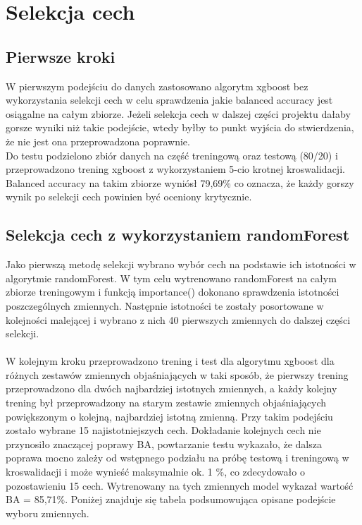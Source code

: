 \documentclass{article}
\begin{document}
\section{Selekcja cech}

\subsection{Pierwsze kroki}

W pierwszym podejściu do danych zastosowano algorytm xgboost bez wykorzystania selekcji cech w celu sprawdzenia jakie balanced accuracy jest osiągalne na całym zbiorze. Jeżeli selekcja cech w dalszej części projektu dałaby gorsze wyniki niż takie podejście, wtedy byłby to punkt wyjścia do stwierdzenia, że nie jest ona przeprowadzona poprawnie. \\
Do testu podzielono zbiór danych na część treningową oraz testową (80/20) i przeprowadzono trening xgboost z wykorzystaniem 5-cio krotnej kroswalidacji.
Balanced accuracy na takim zbiorze wyniósł 79,69\% co oznacza, że każdy gorszy wynik po selekcji cech powinien być oceniony krytycznie.

\subsection{Selekcja cech z wykorzystaniem randomForest}

Jako pierwszą metodę selekcji wybrano wybór cech na podstawie ich istotności  w algorytmie randomForest. W tym celu wytrenowano randomForest na całym zbiorze treningowym i funkcją importance() dokonano sprawdzenia istotności poszczególnych zmiennych. Następnie istotności te zostały posortowane w kolejności malejącej i wybrano z nich 40 pierwszych zmiennych do dalszej części selekcji. \\ \\
W kolejnym kroku przeprowadzono trening i test dla algorytmu xgboost dla różnych zestawów zmiennych objaśniających w taki sposób, że pierwszy trening przeprowadzono dla dwóch najbardziej istotnych zmiennych, a każdy kolejny trening był przeprowadzony na starym zestawie zmiennych objaśniających powiększonym o kolejną, najbardziej istotną zmienną. Przy takim podejściu zostało wybrane 15 najistotniejszych cech. Dokładanie kolejnych cech nie przynosiło znaczącej poprawy BA, powtarzanie testu wykazało, że dalsza poprawa mocno zależy od wstępnego podziału na próbę testową i treningową w kroswalidacji i może wynieść maksymalnie ok. 1 \%, co zdecydowało o pozostawieniu 15 cech.  Wytrenowany na tych zmiennych model wykazał wartość BA = 85,71\%. Poniżej znajduje się tabela podsumowująca opisane podejście wyboru zmiennych. \\
\end{document}
